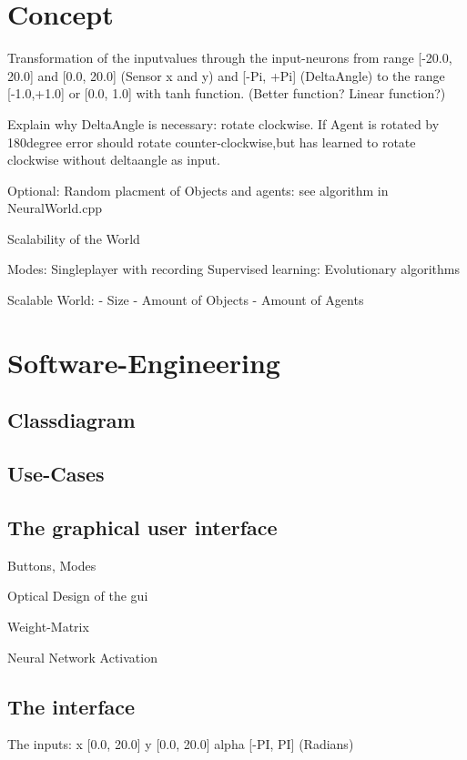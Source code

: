 \documentclass[10pt,a4paper,DIV=11]{scrreprt}
\begin{document}
\section{Concept}


Transformation of the inputvalues through the input-neurons from range [-20.0, 20.0] and [0.0, 20.0] (Sensor x and y) and [-Pi, +Pi] (DeltaAngle) to the range [-1.0,+1.0] or [0.0, 1.0] with tanh function. (Better function? Linear function?)

Explain why DeltaAngle is necessary:
rotate clockwise. If Agent is rotated by 180degree error should rotate counter-clockwise,but
has learned to rotate clockwise without deltaangle as input.


Optional: Random placment of Objects and agents: see algorithm in NeuralWorld.cpp



Scalability of the World


Modes:
Singleplayer with recording
Supervised learning:
Evolutionary algorithms

Scalable World:
- Size
- Amount of Objects
- Amount of Agents

\section{Software-Engineering}

\subsection{Classdiagram}

\subsection{Use-Cases}

\subsection{The graphical user interface}

Buttons, Modes

Optical Design of the gui

Weight-Matrix

Neural Network Activation

\subsection{The interface}


The inputs: 
x  [0.0, 20.0]
y   [0.0, 20.0]
alpha  [-PI, PI] (Radians)
\end{document}
